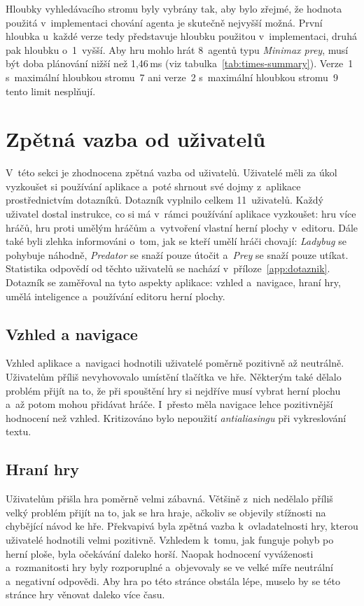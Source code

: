 Hloubky vyhledávacího stromu byly vybrány tak, aby bylo zřejmé, že hodnota použitá v~implementaci chování agenta je skutečně nejvyšší možná. První hloubka u~každé verze tedy představuje hloubku použitou v~implementaci, druhá pak hloubku o~1~vyšší. Aby hru mohlo hrát 8~agentů typu \emph{Minimax prey}, musí být doba plánování nižší než 1,46\,ms (viz tabulka~\ref{tab:times-summary}). Verze~1 s~maximální hloubkou stromu~7 ani verze~2 s~maximální hloubkou stromu~9 tento limit nesplňují.

\section{Zpětná vazba od uživatelů}

V~této sekci je zhodnocena zpětná vazba od uživatelů. Uživatelé měli za úkol vyzkoušet si používání aplikace a~poté shrnout své dojmy z~aplikace prostřednictvím dotazníků. Dotazník vyplnilo celkem 11~uživatelů. Každý uživatel dostal instrukce, co si má v~rámci používání aplikace vyzkoušet: hru více hráčů, hru proti umělým hráčům a~vytvoření vlastní herní plochy v~editoru. Dále také byli zlehka informováni o~tom, jak se kteří umělí hráči chovají: \emph{Ladybug} se pohybuje náhodně, \emph{Predator} se snaží pouze útočit a~\emph{Prey} se snaží pouze utíkat. Statistika odpovědí od těchto uživatelů se nachází v~příloze~\ref{app:dotaznik}. Dotazník se zaměřoval na tyto aspekty aplikace: vzhled a~navigace, hraní hry, umělá inteligence a~používání editoru herní plochy.

\subsection*{Vzhled a navigace}

Vzhled aplikace a~navigaci hodnotili uživatelé poměrně pozitivně až neutrálně. Uživatelům příliš nevyhovovalo umístění tlačítka  ve hře. Některým také dělalo problém přijít na to, že při spouštění hry si nejdříve musí vybrat herní plochu a~až potom mohou přidávat hráče. I~přesto měla navigace lehce pozitivnější hodnocení než vzhled. Kritizováno bylo nepoužití \emph{antialiasingu} při vykreslování textu.

\subsection*{Hraní hry}

Uživatelům přišla hra poměrně velmi zábavná. Většině z~nich nedělalo příliš velký problém přijít na to, jak se hra hraje, ačkoliv se objevily stížnosti na chybějící návod ke hře. Překvapivá byla zpětná vazba k~ovladatelnosti hry, kterou uživatelé hodnotili velmi pozitivně. Vzhledem k~tomu, jak funguje pohyb po herní ploše, byla očekávání daleko horší. Naopak hodnocení vyváženosti a~rozmanitosti hry byly rozporuplné a~objevovaly se ve velké míře neutrální a~negativní odpovědi. Aby hra po této stránce obstála lépe, muselo by se této stránce hry věnovat daleko více času.

